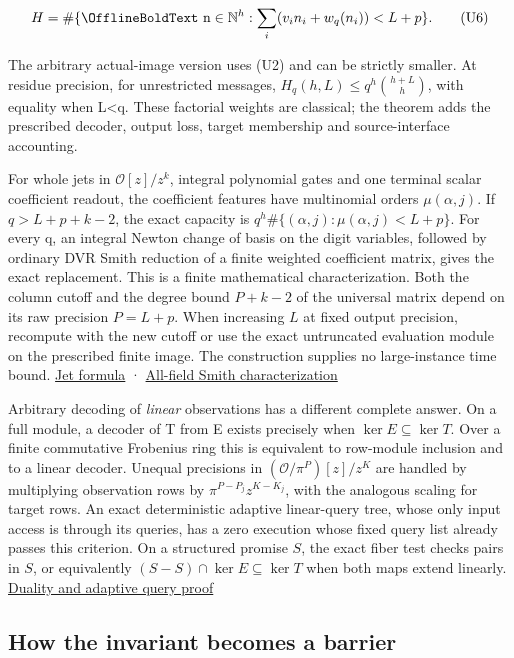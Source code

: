 \documentclass[11pt,a4paper]{article}
\renewcommand{\boldsymbol}[1]{\mathord{\mathchoice
  {\hbox{\OfflineBoldText #1}}{\hbox{\OfflineBoldText #1}}
  {\hbox{\OfflineBoldScript #1}}{\hbox{\OfflineBoldScriptScript #1}}}}
\begin{document}
\[
 H=\#\{\boldsymbol n\in\mathbb N^h:
       \sum_i(v_i n_i+w_q(n_i))<L+p\}. \tag{U6}
\]

The arbitrary actual-image version uses (U2) and can be strictly
smaller. At residue precision, for unrestricted messages,
\(H_q(h,L)\le q^h\binom{h+L}{h}\), with equality when L\textless q.
These factorial weights are classical; the theorem adds the prescribed
decoder, output loss, target membership and source-interface accounting.

For whole jets in \(\mathcal O[z]/z^k\), integral polynomial gates and
one terminal scalar coefficient readout, the coefficient features have
multinomial orders \(\mu(\alpha,j)\). If \(q>L+p+k-2\), the exact
capacity is \(q^h\#\{(\alpha,j):\mu(\alpha,j)<L+p\}\). For every q, an
integral Newton change of basis on the digit variables, followed by
ordinary DVR Smith reduction of a finite weighted coefficient matrix,
gives the exact replacement. This is a finite mathematical
characterization. Both the column cutoff and the degree bound \(P+k-2\)
of the universal matrix depend on its raw precision \(P=L+p\). When
increasing \(L\) at fixed output precision, recompute with the new
cutoff or use the exact untruncated evaluation module on the prescribed
finite image. The construction supplies no large-instance time bound.
\hyperref[v8-section-jet-polynomial-capacity]{Jet formula} ·
\hyperref[v8-section-jet-newton-smith]{All-field Smith characterization}

Arbitrary decoding of \emph{linear} observations has a different
complete answer. On a full module, a decoder of T from E exists
precisely when \(\ker E\subseteq\ker T\). Over a finite commutative
Frobenius ring this is equivalent to row-module inclusion and to a
linear decoder. Unequal precisions in \((\mathcal O/\pi^P)[z]/z^K\) are
handled by multiplying observation rows by \(\pi^{P-P_j}z^{K-K_j}\),
with the analogous scaling for target rows. An exact deterministic
adaptive linear-query tree, whose only input access is through its
queries, has a zero execution whose fixed query list already passes this
criterion. On a structured promise \(S\), the exact fiber test checks
pairs in \(S\), or equivalently \((S-S)\cap\ker E\subseteq\ker T\) when
both maps extend linearly. \hyperref[v8-section-duality-typeset]{Duality
and adaptive query proof}

\subsection{How the invariant becomes a
barrier}\label{v8-how-the-invariant-becomes-a-barrier}
\end{document}
